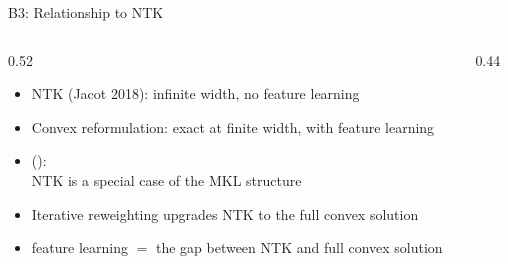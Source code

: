 %
%
\begin{frame}{B3: Relationship to NTK}
  \begin{columns}[c]
    \begin{column}{0.52\textwidth}
      \begin{itemize}
        \item NTK (Jacot 2018): infinite width, no feature learning
        \item Convex reformulation: exact at finite width, with feature learning
        \item \citeauthor{arxiv2309.15096} (\citeyear{arxiv2309.15096}):\\
              NTK is a special case of the MKL structure
        \item Iterative reweighting upgrades NTK to the full convex solution
        \item feature learning $=$ the gap between NTK and full convex solution
      \end{itemize}
    \end{column}
    \begin{column}{0.44\textwidth}
      \begin{center}
\end{center}
\end{column}
\end{columns}
\end{frame}
